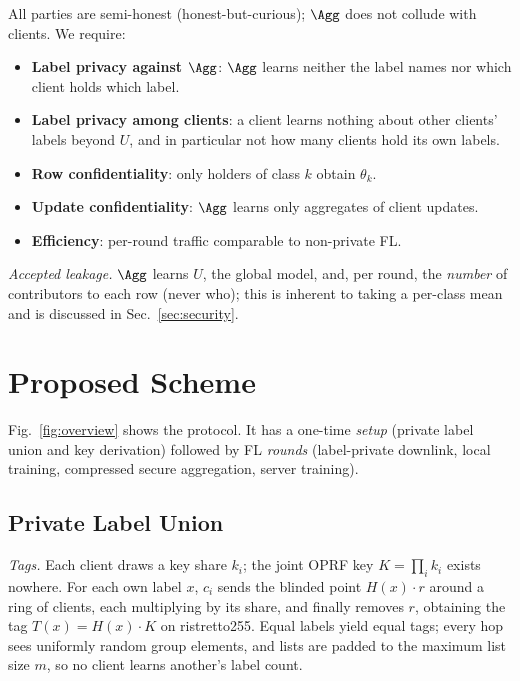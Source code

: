 All parties are semi-honest (honest-but-curious); $\Agg$ does not collude with clients.
We require:
\begin{itemize}
  \item[\textbf{G1}] \textbf{Label privacy against $\Agg$}: $\Agg$ learns neither the label names nor
        which client holds which label.
  \item[\textbf{G2}] \textbf{Label privacy among clients}: a client learns nothing about other clients'
        labels beyond $U$, and in particular not how many clients hold its own labels.
  \item[\textbf{G3}] \textbf{Row confidentiality}: only holders of class $k$ obtain $\theta_k$.
  \item[\textbf{G4}] \textbf{Update confidentiality}: $\Agg$ learns only aggregates of client updates.
  \item[\textbf{G5}] \textbf{Efficiency}: per-round traffic comparable to non-private FL.
\end{itemize}
\emph{Accepted leakage.} $\Agg$ learns $U$, the global model, and, per round, the \emph{number} of
contributors to each row (never who); this is inherent to taking a per-class mean and is discussed
in Sec.~\ref{sec:security}.

\section{Proposed Scheme}
\label{sec:scheme}

Fig.~\ref{fig:overview}  shows the protocol. It has a one-time
\emph{setup} (private label union and key derivation) followed by FL \emph{rounds}
(label-private downlink, local training, compressed secure aggregation, server training).

\subsection{Private Label Union}
\label{sec:union}

\emph{Tags.} Each client draws a key share $k_i$; the joint OPRF key $K=\prod_i k_i$ exists nowhere.
For each own label $x$, $c_i$ sends the blinded point $H(x)\cdot r$ around a ring of clients, each
multiplying by its share, and finally removes $r$, obtaining the tag $T(x)=H(x)\cdot K$ on
ristretto255. Equal labels yield equal tags; every hop sees uniformly random group elements, and lists
are padded to the maximum list size $m$, so no client learns another's label count.


